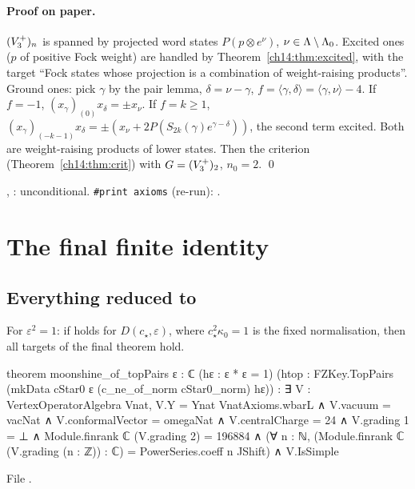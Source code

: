 \paragraph{Proof on paper.}  $(V_3^{+})_n$ is spanned by projected word states $P(p\otimes e^\nu)$,
$\nu\in{\Lambda}\setminus{\Lambda}_0$.  Excited ones ($p$ of positive Fock weight) are handled by
Theorem~\ref{ch14:thm:excited}, with the target ``Fock states whose projection is a combination of
weight-raising products''.  Ground ones: pick $\gamma$ by the pair lemma, $\delta=\nu-\gamma$,
$f=\langle\gamma,\delta\rangle=\langle\gamma,\nu\rangle-4$.  If $f=-1$, $(x_\gamma)_{(0)}x_\delta=\pm x_\nu$.  If $f=k\ge1$,
$(x_\gamma)_{(-k-1)}x_\delta=\pm(x_\nu+2P(S_{2k}(\gamma)e^{\gamma-\delta}))$, the second term excited.  Both are
weight-raising products of lower states.  Then the criterion (Theorem~\ref{ch14:thm:crit}) with $G=(V_3^{+})_2$,
$n_0=2$. \qed

\begin{status}
, : unconditional.  \texttt{\#print axioms}  (re-run): .
\end{status}

\section{The final finite identity}\label{ch14:sec:toppairs}

\subsection{\texorpdfstring{Everything reduced to }{Everything reduced to TopPairs}}

\begin{theorem}\label{ch14:thm:maintop}
For $\varepsilon^2=1$: if  holds for $D(c_\star,\varepsilon)$, where $c_\star^2\kappa_0=1$ is the
fixed normalisation, then all targets of the final theorem hold.
\end{theorem}
\begin{leancode}
theorem moonshine_of_topPairs {ε : ℂ} (hε : ε * ε = 1)
    (htop : FZKey.TopPairs (mkData cStar0 ε (c_ne_of_norm cStar0_norm) hε)) :
    ∃ V : VertexOperatorAlgebra Vnat,
      V.Y = Ynat VnatAxioms.wbarL ∧ V.vacuum = vacNat ∧ V.conformalVector = omegaNat ∧
      V.centralCharge = 24 ∧
      V.grading 1 = ⊥ ∧
      Module.finrank ℂ (V.grading 2) = 196884 ∧
      (∀ n : ℕ, (Module.finrank ℂ (V.grading (n : ℤ)) : ℂ) = PowerSeries.coeff n JShift) ∧
      V.IsSimple
\end{leancode}
File .

